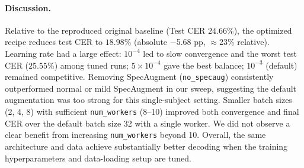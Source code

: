 \paragraph{Discussion.}
Relative to the reproduced original baseline (Test CER $24.66\%$), the optimized recipe reduces test CER to $18.98\%$ (absolute $-$5.68 pp, $\approx$23\% relative). Learning rate had a large effect: $10^{-4}$ led to slow convergence and the worst test CER ($25.55\%$) among tuned runs; $5\times10^{-4}$ gave the best balance; $10^{-3}$ (default) remained competitive. Removing SpecAugment (\texttt{no\_specaug}) consistently outperformed normal or mild SpecAugment in our sweep, suggesting the default augmentation was too strong for this single-subject setting. Smaller batch sizes (2, 4, 8) with sufficient \texttt{num\_workers} (8--10) improved both convergence and final CER over the default batch size 32 with a single worker. We did not observe a clear benefit from increasing \texttt{num\_workers} beyond 10. Overall, the same architecture and data achieve substantially better decoding when the training hyperparameters and data-loading setup are tuned.
